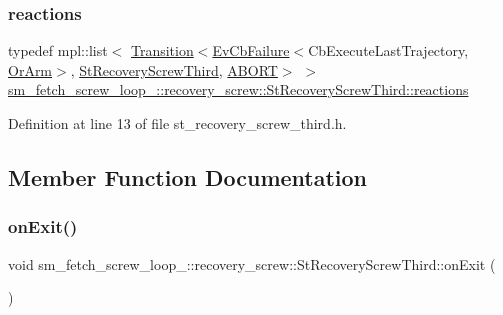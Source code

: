 \subsubsection{\texorpdfstring{reactions}{reactions}}
{\footnotesize\ttfamily typedef mpl\+::list$<$ \hyperlink{classsmacc_1_1Transition}{Transition}$<$\hyperlink{structsmacc_1_1EvCbFailure}{Ev\+Cb\+Failure}$<$Cb\+Execute\+Last\+Trajectory, \hyperlink{classsm__fetch__screw__loop__1_1_1OrArm}{Or\+Arm}$>$, \hyperlink{structsm__fetch__screw__loop__1_1_1recovery__screw_1_1StRecoveryScrewThird}{St\+Recovery\+Screw\+Third}, \hyperlink{structsmacc_1_1default__transition__tags_1_1ABORT}{A\+B\+O\+RT}$>$ $>$ \hyperlink{structsm__fetch__screw__loop__1_1_1recovery__screw_1_1StRecoveryScrewThird_aa6944457713639a137fe0ec81fd3b35e}{sm\+\_\+fetch\+\_\+screw\+\_\+loop\+\_\+::recovery\+\_\+screw\+::\+St\+Recovery\+Screw\+Third\+::reactions}}



Definition at line 13 of file st\+\_\+recovery\+\_\+screw\+\_\+third.\+h.



\subsection{Member Function Documentation}
\mbox{\label{structsm__fetch__screw__loop__1_1_1recovery__screw_1_1StRecoveryScrewThird_a548aea6eb063f2e1dda8bf6e4d06d15e}} 
\subsubsection{\texorpdfstring{on\+Exit()}{onExit()}}
{\footnotesize\ttfamily void sm\+\_\+fetch\+\_\+screw\+\_\+loop\+\_\+::recovery\+\_\+screw\+::\+St\+Recovery\+Screw\+Third\+::on\+Exit (\begin{DoxyParamCaption}{ }\end{DoxyParamCaption})\hspace{0.3cm}{\ttfamily [inline]}}



